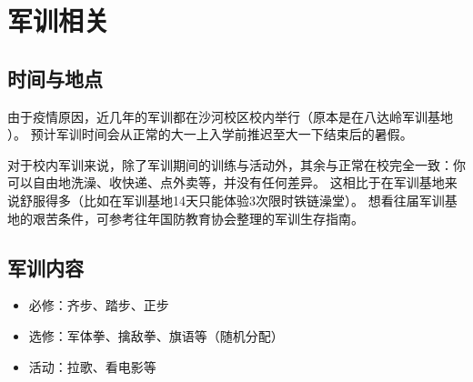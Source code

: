 \section{军训相关}

\subsection*{时间与地点}

由于疫情原因，近几年的军训都在沙河校区校内举行（原本是在八达岭军训基地 ）。
预计军训时间会从正常的大一上入学前推迟至大一下结束后的暑假。

对于校内军训来说，除了军训期间的训练与活动外，其余与正常在校完全一致：你可以自由地洗澡、收快递、点外卖等，并没有任何差异。
这相比于在军训基地来说舒服得多（比如在军训基地14天只能体验3次限时铁链澡堂）。
想看往届军训基地的艰苦条件，可参考往年国防教育协会整理的军训生存指南。

\subsection*{军训内容}

\begin{itemize}
    \item 必修：齐步、踏步、正步
    \item 选修：军体拳、擒敌拳、旗语等（随机分配）
    \item 活动：拉歌、看电影等
\end{itemize}
